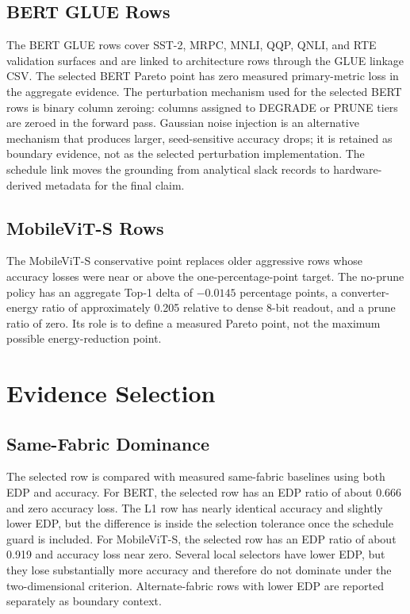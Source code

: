 \documentclass[10pt,journal]{IEEEtran}
\begin{document}
\subsection{BERT GLUE Rows}

The BERT GLUE rows cover SST-2, MRPC, MNLI, QQP, QNLI, and RTE validation
surfaces and are linked to architecture rows through the GLUE linkage CSV. The
selected BERT Pareto point has zero measured primary-metric loss in the
aggregate evidence. The perturbation mechanism used for the selected BERT rows
is binary column zeroing: columns assigned to DEGRADE or PRUNE tiers are zeroed
in the forward pass. Gaussian noise injection is an alternative mechanism that
produces larger, seed-sensitive accuracy drops; it is retained as boundary
evidence, not as the selected perturbation implementation. The schedule link
moves the grounding from analytical slack records to hardware-derived metadata
for the final claim.

\subsection{MobileViT-S Rows}

The MobileViT-S conservative point replaces older aggressive rows whose
accuracy losses were near or above the one-percentage-point target. The
no-prune policy has an aggregate Top-1 delta of \(-0.0145\) percentage points,
a converter-energy ratio of approximately 0.205 relative to dense 8-bit
readout, and a prune ratio of zero. Its role is to define a measured Pareto
point, not the maximum possible energy-reduction point.

\section{Evidence Selection}

\subsection{Same-Fabric Dominance}

The selected row is compared with measured same-fabric baselines using both EDP
and accuracy. For BERT, the selected row has an EDP ratio of about
0.666 and zero accuracy loss. The L1 row has nearly identical accuracy and
slightly lower EDP, but the difference is inside the selection tolerance once
the schedule guard is included. For MobileViT-S, the selected row has an EDP
ratio of about 0.919 and accuracy loss near zero. Several local selectors have
lower EDP, but they lose substantially more accuracy and therefore do not
dominate under the two-dimensional criterion. Alternate-fabric rows with lower
EDP are reported separately as boundary context.
\end{document}
